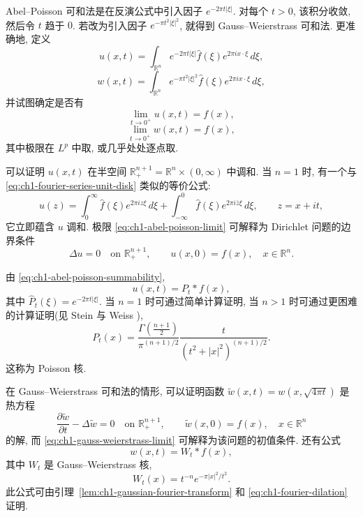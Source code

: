 Abel--Poisson 可和法是在反演公式中引入因子 $e^{-2\pi t|\xi|}$. 对每个 $t>0$, 该积分收敛, 然后令 $t$ 趋于 $0$. 若改为引入因子 $e^{-\pi t^2|\xi|^2}$, 就得到 Gauss--Weierstrass 可和法. 更准确地, 定义
\begin{equation}
\label{eq:ch1-abel-poisson-summability}
 u(x,t)=\int_{\mathbb R^n}e^{-2\pi t|\xi|}\widehat f(\xi)e^{2\pi ix\cdot\xi}\,d\xi,
\end{equation}
\begin{equation}
\label{eq:ch1-gauss-weierstrass-summability}
 w(x,t)=\int_{\mathbb R^n}e^{-\pi t^2|\xi|^2}\widehat f(\xi)e^{2\pi ix\cdot\xi}\,d\xi,
\end{equation}
并试图确定是否有
\begin{equation}
\label{eq:ch1-abel-poisson-limit}
 \lim_{t\to0^+}u(x,t)=f(x),
\end{equation}
\hypertarget{chapter-01-page-031}{}
\begin{equation}
\label{eq:ch1-gauss-weierstrass-limit}
 \lim_{t\to0^+}w(x,t)=f(x),
\end{equation}
其中极限在 $L^p$ 中取, 或几乎处处逐点取.

可以证明 $u(x,t)$ 在半空间 $\mathbb R_+^{n+1}=\mathbb R^n\times(0,\infty)$ 中调和. 当 $n=1$ 时, 有一个与 \eqref{eq:ch1-fourier-series-unit-disk} 类似的等价公式:
\begin{equation}
\label{eq:ch1-abel-poisson-complex-formula}
 u(z)=\int_0^\infty\widehat f(\xi)e^{2\pi iz\xi}\,d\xi
 +\int_{-\infty}^0\widehat f(\xi)e^{2\pi i\overline z\xi}\,d\xi,
 \qquad z=x+it,
\end{equation}
它立即蕴含 $u$ 调和. 极限 \eqref{eq:ch1-abel-poisson-limit} 可解释为 Dirichlet 问题的边界条件
\[
 \Delta u=0\quad\text{on }\mathbb R_+^{n+1},
 \qquad
 u(x,0)=f(x),\quad x\in\mathbb R^n.
\]

由 \eqref{eq:ch1-abel-poisson-summability},
\[
 u(x,t)=P_t*f(x),
\]
其中 $\widehat P_t(\xi)=e^{-2\pi t|\xi|}$. 当 $n=1$ 时可通过简单计算证明, 当 $n>1$ 时可通过更困难的计算证明(见 Stein 与 Weiss ),
\begin{equation}
\label{eq:ch1-poisson-kernel-half-space}
 P_t(x)=\frac{\Gamma\left(\frac{n+1}{2}\right)}{\pi^{(n+1)/2}}
 \frac{t}{(t^2+|x|^2)^{(n+1)/2}}.
\end{equation}
这称为 Poisson 核.

在 Gauss--Weierstrass 可和法的情形, 可以证明函数 $\widetilde w(x,t)=w(x,\sqrt{4\pi t})$ 是热方程
\[
 \frac{\partial\widetilde w}{\partial t}-\Delta\widetilde w=0
 \quad\text{on }\mathbb R_+^{n+1},
 \qquad
 \widetilde w(x,0)=f(x),\quad x\in\mathbb R^n
\]
的解, 而 \eqref{eq:ch1-gauss-weierstrass-limit} 可解释为该问题的初值条件. 还有公式
\[
 w(x,t)=W_t*f(x),
\]
其中 $W_t$ 是 Gauss--Weierstrass 核,
\begin{equation}
\label{eq:ch1-gauss-weierstrass-kernel}
 W_t(x)=t^{-n}e^{-\pi|x|^2/t^2}.
\end{equation}
此公式可由引理~\ref{lem:ch1-gaussian-fourier-transform} 和 \eqref{eq:ch1-fourier-dilation} 证明.

